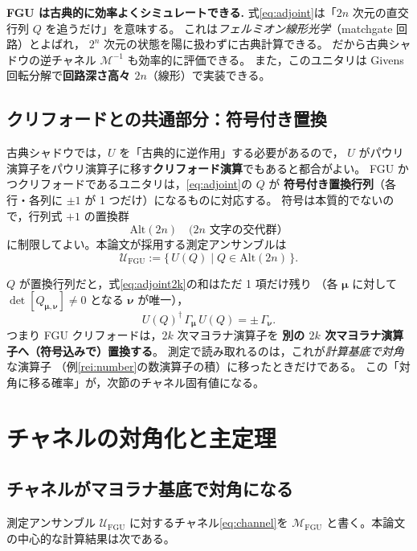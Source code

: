 \documentclass[11pt,a4paper]{ltjsarticle}
\newcommand{\Uc}{\mathcal{U}}
\newcommand{\Mc}{\mathcal{M}}
\newcommand{\FGU}{\mathrm{FGU}}
\newcommand{\Alt}{\mathrm{Alt}}
\theoremstyle{definition}
\theoremstyle{plain}
\begin{document}
\begin{keybox}
\textbf{FGU は古典的に効率よくシミュレートできる.}\;
式\eqref{eq:adjoint}は「$2n$ 次元の直交行列 $Q$ を追うだけ」を意味する。
これは\emph{フェルミオン線形光学}（matchgate 回路）とよばれ，
$2^n$ 次元の状態を陽に扱わずに古典計算できる。
だから古典シャドウの逆チャネル $\Mc^{-1}$ も効率的に評価できる。
また，このユニタリは Givens 回転分解で\textbf{回路深さ高々 $2n$}（線形）で実装できる。
\end{keybox}

\subsection{クリフォードとの共通部分：符号付き置換}
古典シャドウでは，$U$ を「古典的に逆作用」する必要があるので，
$U$ がパウリ演算子をパウリ演算子に移す\textbf{クリフォード演算}でもあると都合がよい。
FGU かつクリフォードであるユニタリは，\eqref{eq:adjoint}の $Q$ が
\textbf{符号付き置換行列}（各行・各列に $\pm1$ が 1 つだけ）になるものに対応する。
符号は本質的でないので，行列式 $+1$ の置換群
\[
  \Alt(2n)\quad(\text{$2n$ 文字の交代群}）
\]
に制限してよい。本論文が採用する測定アンサンブルは
\begin{equation}
  \boxed{\ \Uc_{\FGU}:=\{\,U(Q)\mid Q\in\Alt(2n)\,\}. \ }
  \label{eq:UFGU}
\end{equation}
\begin{ideabox}
$Q$ が置換行列だと，式\eqref{eq:adjoint2k}の和はただ 1 項だけ残り
（各 $\bm\mu$ に対して $\det[Q_{\bm\mu,\bm\nu}]\ne0$ となる $\bm\nu$ が唯一），
\[
  U(Q)^\dagger\,\Gamma_{\bm\mu}\,U(Q)=\pm\,\Gamma_{\bm\nu}.
\]
つまり FGU クリフォードは，$2k$ 次マヨラナ演算子を
\textbf{別の $2k$ 次マヨラナ演算子へ（符号込みで）置換する}。
測定で読み取れるのは，これが\emph{計算基底で対角}な演算子
（例\ref{rei:number}の数演算子の積）に移ったときだけである。
この「対角に移る確率」が，次節のチャネル固有値になる。
\end{ideabox}

\section{チャネルの対角化と主定理}\label{sec:main}

\subsection{チャネルがマヨラナ基底で対角になる}
測定アンサンブル $\Uc_\FGU$ に対するチャネル\eqref{eq:channel}を
$\Mc_\FGU$ と書く。本論文の中心的な計算結果は次である。
\end{document}
